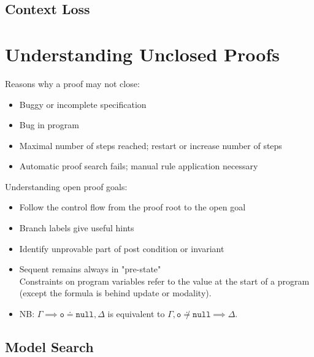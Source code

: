 	\subsection{Context Loss} %

	\section{Understanding Unclosed Proofs}
		Reasons why a proof may not close:
		\begin{itemize}
			\item Buggy or incomplete specification
			\item Bug in program
			\item Maximal number of steps reached; restart or increase number of steps
			\item Automatic proof search fails; manual rule application necessary
		\end{itemize}

		Understanding open proof goals:
		\begin{itemize}
			\item Follow the control flow from the proof root to the open goal
			\item Branch labels give useful hints
			\item Identify unprovable part of post condition or invariant
			\item Sequent remains always in "pre-state" \\ Constraints on program variables refer to the value at the start of a program (except the formula is behind update or modality).
			\item NB: \( \Gamma \implies \texttt{o} \doteq \texttt{null}, \Delta \) is equivalent to \( \Gamma, \texttt{o} \not\doteq \texttt{null} \implies \Delta \).
		\end{itemize}

		\subsection{Model Search} %
